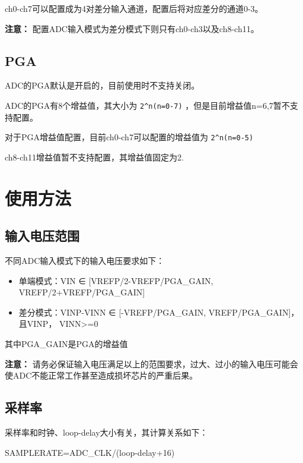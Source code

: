 \documentclass[
  12pt,
]{book}
\begin{document}
ch0-ch7可以配置成为4对差分输入通道，配置后将对应差分的通道0-3。

\textbf{注意：} 配置ADC输入模式为差分模式下则只有ch0-ch3以及ch8-ch11。

\hypertarget{pga}{%
\subsection{PGA}\label{pga}}

ADC的PGA默认是开启的，目前使用时不支持关闭。

ADC的PGA有8个增益值，其大小为 \texttt{2\^{}n(n=0-7)} ，但是目前增益值n=6,7暂不支持配置。

对于PGA增益值配置，目前ch0-ch7可以配置的增益值为 \texttt{2\^{}n(n=0-5)}

ch8-ch11增益值暂不支持配置，其增益值固定为2.

\hypertarget{ux4f7fux7528ux65b9ux6cd5}{%
\section{使用方法}\label{ux4f7fux7528ux65b9ux6cd5}}

\hypertarget{ux8f93ux5165ux7535ux538bux8303ux56f4}{%
\subsection{输入电压范围}\label{ux8f93ux5165ux7535ux538bux8303ux56f4}}

不同ADC输入模式下的输入电压要求如下：

\begin{itemize}
\item
  单端模式：VIN ∈ {[}VREFP/2-VREFP/PGA\_GAIN, VREFP/2+VREFP/PGA\_GAIN{]}
\item
  差分模式：VINP-VINN ∈ {[}-VREFP/PGA\_GAIN, VREFP/PGA\_GAIN{]}，且VINP， VINN\textgreater=0
\end{itemize}

其中PGA\_GAIN是PGA的增益值

\textbf{注意：} 请务必保证输入电压满足以上的范围要求，过大、过小的输入电压可能会使ADC不能正常工作甚至造成损坏芯片的严重后果。

\hypertarget{ux91c7ux6837ux7387}{%
\subsection{采样率}\label{ux91c7ux6837ux7387}}

采样率和时钟、loop-delay大小有关，其计算关系如下：

SAMPLERATE=ADC\_CLK/(loop-delay+16)
\end{document}
